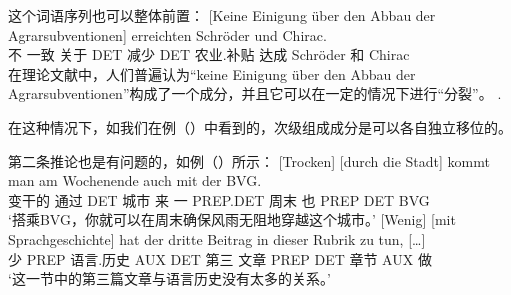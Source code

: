 这个词语序列也可以整体前置：
\ea
\gll {}[Keine Einigung über den Abbau der Agrarsubventionen] erreichten Schröder und Chirac.\\
     \spacebr{}不 一致 关于 DET 减少 DET 农业.补贴  达成 Schröder 和 Chirac\\
\z
在理论文献中，人们普遍认为“keine Einigung über den Abbau der Agrarsubventionen”构成了一个成分，并且它可以在一定的情况下进行“分裂”。
  .
\pagebreak

\noindent
在这种情况下，如我们在例（）中看到的，次级组成成分是可以各自独立移位的。\citep{deKuthy2002a} 

第二条推论也是有问题的，如例（）所示：
\eal
\label{bsp-mehr-vf}
\ex\label{bsp-trocken-durch-die-stadt}
\gll {}[Trocken] [durch die Stadt] kommt man am Wochenende auch mit der BVG.\footnotemark\\
	 \spacebr{}变干的 \spacebr{}通过 DET 城市 来 一 PREP.DET 周末 也 PREP DET BVG\\
\glt `搭乘BVG，你就可以在周末确保风雨无阻地穿越这个城市。'
\ex 
\gll {}[Wenig] [mit Sprachgeschichte] hat der dritte Beitrag in dieser Rubrik zu tun, [\ldots]\footnotemark\\
       \spacebr{}少 \spacebr{} PREP 语言.历史 AUX DET 第三 文章 PREP DET 章节 AUX 做\\
\glt `这一节中的第三篇文章与语言历史没有太多的关系。'
\zl

